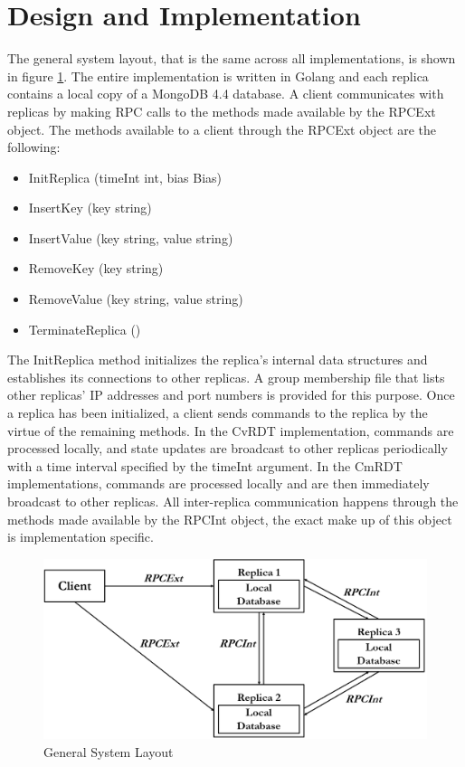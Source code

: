 \documentclass[sigconf,nonacm,11pt]{acmart}
\begin{document}
\section{Design and Implementation}
The general system layout, that is the same across all implementations, is shown in figure \ref{fig:sys}. The entire implementation is written in Golang and each replica contains a local copy of a MongoDB 4.4 database. A client communicates with replicas by making RPC calls to the methods made available by the RPCExt object. The methods available to a client through the RPCExt object are the following:
\begin{itemize}
 \item InitReplica (timeInt int, bias Bias)
 \item InsertKey (key string)
 \item InsertValue (key string, value string)
 \item RemoveKey (key string)
 \item RemoveValue (key string, value string)
 \item TerminateReplica ()
\end{itemize}

The InitReplica method initializes the replica's internal data structures and establishes its connections to other replicas. A group membership file that lists other replicas' IP addresses and port numbers is provided for this purpose. Once a replica has been initialized, a client sends commands to the replica by the virtue of the remaining methods. In the CvRDT implementation, commands are processed locally, and state updates are broadcast to other replicas periodically with a time interval specified by the timeInt argument. In the CmRDT implementations, commands are processed locally and are then immediately broadcast to other replicas. All inter-replica communication happens through the methods made available by the RPCInt object, the exact make up of this object is implementation specific.

\begin{figure}[h]
  \centering
  \includegraphics[width=\linewidth]{Fig1Sys}
  \caption{General System Layout}
  \label{fig:sys}
\end{figure}
\end{document}
